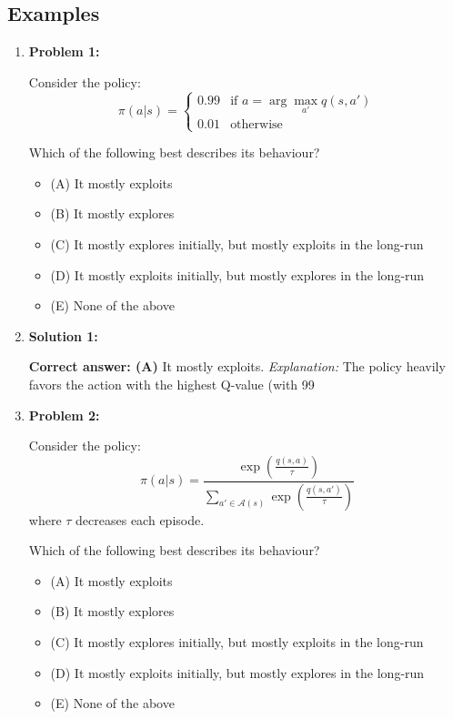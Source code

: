 \subsection{Examples}
\begin{example}
    \begin{enumerate}

        \item \textbf{Problem 1:}
    
        Consider the policy:
        \[
        \pi(a|s) = 
        \begin{cases}
        0.99 & \text{if } a = \arg\max_{a'} q(s, a') \\
        0.01 & \text{otherwise}
        \end{cases}
        \]
    
        Which of the following best describes its behaviour?
        \begin{itemize}
            \item (A) It mostly exploits
            \item (B) It mostly explores
            \item (C) It mostly explores initially, but mostly exploits in the long-run
            \item (D) It mostly exploits initially, but mostly explores in the long-run
            \item (E) None of the above
        \end{itemize}
    
        \item \textbf{Solution 1:}
    
        \textbf{Correct answer: (A)} It mostly exploits.  
        \textit{Explanation:} The policy heavily favors the action with the highest Q-value (with 99%
    
        \item \textbf{Problem 2:}
    
        Consider the policy:
        \[
        \pi(a|s) = \frac{\exp\left(\frac{q(s,a)}{\tau}\right)}{\sum\limits_{a' \in \mathcal{A}(s)} \exp\left(\frac{q(s,a')}{\tau}\right)}
        \]
        where $\tau$ decreases each episode.
    
        Which of the following best describes its behaviour?
        \begin{itemize}
            \item (A) It mostly exploits
            \item (B) It mostly explores
            \item (C) It mostly explores initially, but mostly exploits in the long-run
            \item (D) It mostly exploits initially, but mostly explores in the long-run
            \item (E) None of the above
        \end{itemize}
    

\end{enumerate}
\end{example}
